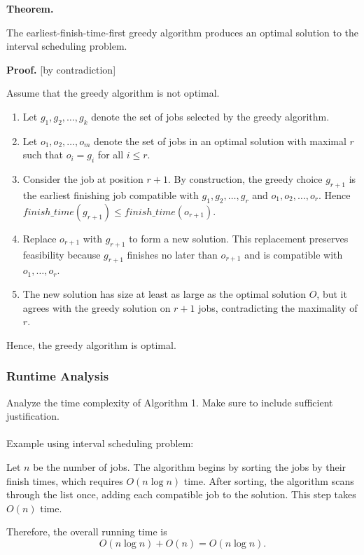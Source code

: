 \documentclass{article}
\begin{document}
\noindent\textbf{Theorem.} 

The earliest-finish-time-first greedy algorithm produces an optimal solution to the interval scheduling problem.

\noindent\textbf{Proof.} [by contradiction]  

Assume that the greedy algorithm is not optimal.

\begin{enumerate}
    \item Let $g_1, g_2, \ldots, g_k$ denote the set of jobs selected by the greedy algorithm.  
    \item Let $o_1, o_2, \ldots, o_m$ denote the set of jobs in an optimal solution with maximal $r$ such that $o_i = g_i$ for all $i \leq r$.  
    \item Consider the job at position $r+1$. By construction, the greedy choice $g_{r+1}$ is the earliest finishing job compatible with $g_1, g_2, \ldots, g_r$ and $o_1, o_2, \ldots, o_r$. Hence $finish\_time(g_{r+1}) \leq finish\_time(o_{r+1})$.  
    \item Replace $o_{r+1}$ with $g_{r+1}$ to form a new solution. This replacement preserves feasibility because $g_{r+1}$ finishes no later than $o_{r+1}$ and is compatible with $o_1, \ldots, o_r$.  
    \item The new solution has size at least as large as the optimal solution $O$, but it agrees with the greedy solution on $r+1$ jobs, contradicting the maximality of $r$.  
\end{enumerate}

Hence, the greedy algorithm is optimal.


\subsubsection{Runtime Analysis}
{\color{red} Analyze the time complexity of Algorithm 1. Make sure to include sufficient justification.\\\\ Example using interval scheduling problem:\\}

Let $n$ be the number of jobs. The algorithm begins by sorting the jobs by their finish times, which requires $O(n \log n)$ time.  
After sorting, the algorithm scans through the list once, adding each compatible job to the solution. This step takes $O(n)$ time.  

Therefore, the overall running time is 
\[
O(n \log n) + O(n) = O(n \log n).
\]
\end{document}
